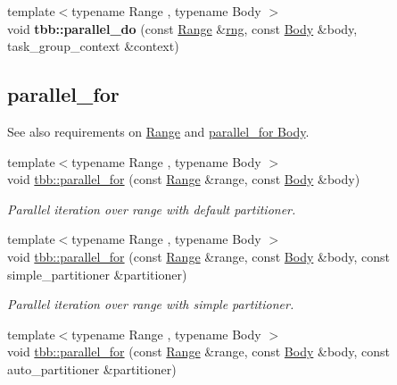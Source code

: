 \begin{DoxyCompactItemize}
\item 
\hypertarget{group__algorithms_ga40258ae16882a49d5d579407c88b3281}{}{\footnotesize template$<$typename Range , typename Body $>$ }\\void {\bfseries tbb\+::parallel\+\_\+do} (const \hyperlink{classtbb_1_1blocked__range}{Range} \&\hyperlink{structrng}{rng}, const \hyperlink{classBody}{Body} \&body, task\+\_\+group\+\_\+context \&context)\label{group__algorithms_ga40258ae16882a49d5d579407c88b3281}

\end{DoxyCompactItemize}
\subsection*{parallel\+\_\+for}
\label{_amgrp020f371880777e82219a69f8a512e874}%
See also requirements on \hyperlink{range_req}{Range} and \hyperlink{parallel_for_body_req}{parallel\+\_\+for Body}. \begin{DoxyCompactItemize}
\item 
{\footnotesize template$<$typename Range , typename Body $>$ }\\void \hyperlink{group__algorithms_gaa8444c29dc4d2e527a1036717d109aef}{tbb\+::parallel\+\_\+for} (const \hyperlink{classtbb_1_1blocked__range}{Range} \&range, const \hyperlink{classBody}{Body} \&body)
\begin{DoxyCompactList}\small\item\em Parallel iteration over range with default partitioner. \end{DoxyCompactList}\item 
{\footnotesize template$<$typename Range , typename Body $>$ }\\void \hyperlink{group__algorithms_ga9722d2bc7e5edb4fae9f3b55268a1ecc}{tbb\+::parallel\+\_\+for} (const \hyperlink{classtbb_1_1blocked__range}{Range} \&range, const \hyperlink{classBody}{Body} \&body, const simple\+\_\+partitioner \&partitioner)
\begin{DoxyCompactList}\small\item\em Parallel iteration over range with simple partitioner. \end{DoxyCompactList}\item 
{\footnotesize template$<$typename Range , typename Body $>$ }\\void \hyperlink{group__algorithms_gad6c4b06f96ae33cefe78235841791902}{tbb\+::parallel\+\_\+for} (const \hyperlink{classtbb_1_1blocked__range}{Range} \&range, const \hyperlink{classBody}{Body} \&body, const auto\+\_\+partitioner \&partitioner)

\end{DoxyCompactItemize}
